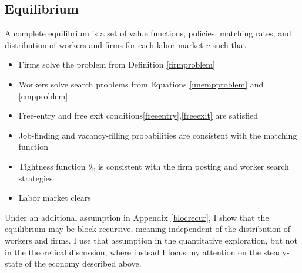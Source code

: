 \subsection{Equilibrium}
A complete equilibrium is a set of value functions, policies, matching rates, and distribution of workers and firms for each labor market $v$ such that 
\begin{itemize}
    \item Firms solve the problem from Definition \ref{firmproblem}
    \item Workers solve search problems from Equations \ref{unempproblem} and \ref{empproblem}
    \item Free-entry  and free exit conditions\ref{freeentry},\ref{freeexit}  are satisfied
    \item Job-finding and vacancy-filling probabilities are consistent with the matching function
    \item Tightness function $\theta_v$ is consistent with the firm posting and worker search strategies
    \item Labor market clears
\end{itemize}
Under an additional assumption in Appendix \ref{blocrecur}, I show that the equilibrium may be block recursive, meaning independent of the distribution of workers and firms. I use that assumption in the quantitative exploration, but not in the theoretical discussion, where instead I focus my attention on the steady-state of the economy described above.

